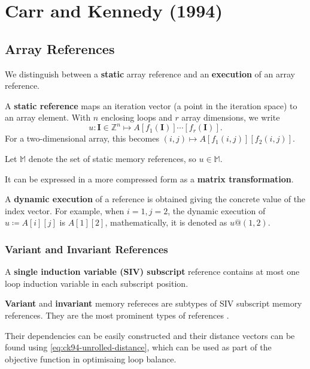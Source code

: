 \chapter{Carr and Kennedy (1994)}
\label{chap:ck94}

\section{Array References}
\label{sec:ck94-array-references}

We distinguish between a \textbf{static} array reference and
an \textbf{execution} of an array reference.

A \textbf{static reference} maps an iteration vector (a point in the
iteration space) to an array element. With $n$ enclosing loops and $r$
array dimensions, we write
\begin{equation}
  u: \mathbf{I} \in \mathbb{Z}^{n} \longmapsto
  A[f_{1}(\mathbf{I})]\cdots[f_{r}(\mathbf{I})].
  \label{eq:ck94-static-reference}
\end{equation}
For a two-dimensional array, this becomes
$(i,j) \mapsto A[f_{1}(i,j)][f_{2}(i,j)]$.

Let $\mathbb{M}$ denote the set of static memory references, so
$u \in \mathbb{M}$.

It can be expressed in a more compressed form as a \textbf{matrix
transformation}.

A \textbf{dynamic execution} of a reference is obtained giving the concrete value of the
index vector.
For example, when $i=1, j=2$, the dynamic execution of $u \coloneqq A[i][j]$ is
$A[1][2]$, mathematically, it is denoted as $u@(1,2)$.

\subsection{Variant and Invariant References}

A \textbf{single induction variable (SIV) subscript} reference contains
at most one loop induction variable in each subscript position.

\textbf{Variant} and \textbf{invariant} memory refereces are subtypes of SIV
subscript memory references. They are the most prominent types of references
\cite{carrKennedy1994}.

Their dependencies can be easily constructed and their distance vectors can
be found using \cref{eq:ck94-unrolled-distance}, which can be used as part of
the objective function in optimisaing loop balance.

